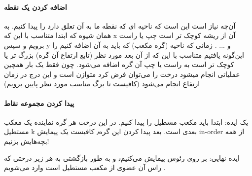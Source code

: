  
 \paragraph{اضافه کردن یک نقطه}
 آن‌چه نیاز است این است که ناحیه ای که نقطه ما به آن تعلق دارد را پیدا کنیم.
 به همان شیوه که ابتدا متناسب با این که x آن از ریشه کوچک تر است چپ یا راست برویم و سپس y و ... . زمانی که ناحیه (گره مکعب) که باید به آن اضافه کنیم را این‌گونه یافتیم متناسب با این که از آن بعد مورد نظر (تابع ارتفاع آن گره) بزرگ تر یا کوچک تر است به راست یا چپ آن گره اضافه می‌شود.
 چون فقط یک بار همچین عملیاتی انجام میشود درخت را می‌توان فرض کرد متوازن است و این درج در زمان ارتفاع انجام می‌شود (کافیست تا برگ مناسب مورد نظر پایین برویم)
 
 
 \paragraph{پیدا کردن مجموعه نقاط}
 یک ایده:
ابتدا باید مکعب مسطیل را پیدا کنیم. در این درخت هر گره نماینده یک معکب مستطیل k بعدی است. 
بعد پیدا کردن این گره٫ کافیست یک پیمایش in-order از همه بچه‌هایش بزنیم!

ایده نهایی:
بر روی رئوس پیمایش می‌کنیم٫ 
و به طور بازگشتی به هر زیر درختی که راس آن عضوی از مکعب مستطیل است وارد می‌شویم .
 
